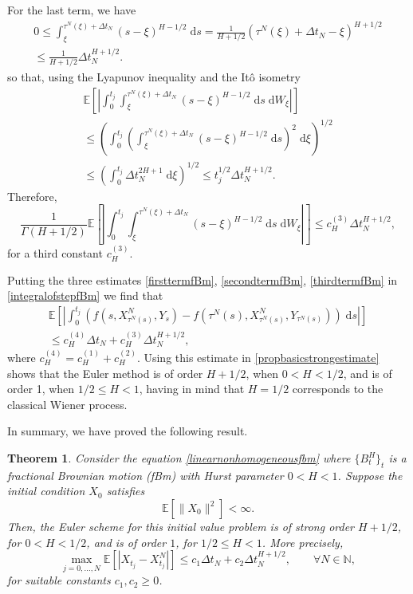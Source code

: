 \documentclass[reqno,12pt]{amsart}
\theoremstyle{plain} %
\newtheorem{theorem}{Theorem}[section]
\theoremstyle{definition} %
\begin{document}
For the last term, we have
\begin{multline*}
    0 \leq \int_\xi^{\tau^N(\xi) + \Delta t_N} (s - \xi)^{H-1/2} \;\mathrm{d}s = \frac{1}{H + 1/2} (\tau^N(\xi) + \Delta t_N - \xi)^{H + 1/2} \\
    \leq \frac{1}{H + 1/2} \Delta t_N^{H + 1/2}.
\end{multline*}
so that, using the Lyapunov inequality and the It\^o isometry
\begin{multline*}
    \mathbb{E}\left[\left|\int_0^{t_j} \int_\xi^{\tau^N(\xi) + \Delta t_N} (s - \xi)^{H-1/2} \;\mathrm{d}s \;\mathrm{d}W_\xi\right|\right] \\
    \leq \left( \int_0^{t_j} \left(\int_\xi^{\tau^N(\xi) + \Delta t_N} (s - \xi)^{H-1/2} \;\mathrm{d}s\right)^2 \;\mathrm{d}\xi\right)^{1/2} \\ 
    \leq \left( \int_0^{t_j} \Delta t_N^{2H + 1} \;\mathrm{d}\xi\right)^{1/2} \leq t_j^{1/2} \Delta t_N^{H + 1/2}.
\end{multline*}
Therefore,
\begin{equation}
    \label{thirdtermfBm}
    \frac{1}{\Gamma(H + 1/2)}\mathbb{E}\left[\left|\int_0^{t_j} \int_\xi^{\tau^N(\xi) + \Delta t_N} (s - \xi)^{H-1/2} \;\mathrm{d}s \;\mathrm{d}W_\xi\right|\right] \leq c_H^{(3)} \Delta t_N^{H + 1/2},
\end{equation}
for a third constant $c_H^{(3)}$.

Putting the three estimates \cref{firsttermfBm}, \cref{secondtermfBm}, \cref{thirdtermfBm} in \cref{integralofstepfBm} we find that
\begin{multline}
    \mathbb{E}\left[\left|\int_0^{t_j} \left( f(s, X_{\tau^N(s)}^N, Y_s) - f(\tau^N(s), X_{\tau^N(s)}^N, Y_{\tau^N(s)}) \right)\;\mathrm{d}s\right|\right] \\
    \leq c_H^{(4)} \Delta t_N + c_H^{(3)} \Delta t_N^{H + 1/2},
\end{multline}
where $c_H^{(4)} = c_H^{(1)} + c_H^{(2)}$. Using this estimate in \cref{propbasicstrongestimate} shows that the Euler method is of order $H + 1/2$, when $0 < H < 1/2$, and is of order 1, when $1/2 \leq H < 1$, having in mind that $H=1/2$ corresponds to the classical Wiener process.

In summary, we have proved the following result.
\begin{theorem}
    Consider the equation \cref{linearnonhomogeneousfbm} where $\{B^H_t\}_t$ is a fractional Brownian motion (fBm) with Hurst parameter $0 < H < 1$. Suppose the initial condition $X_0$ satisfies
    \begin{equation}
        \label{EX0square2b}
        \mathbb{E}[\|X_0\|^2] < \infty.
    \end{equation}
    Then, the Euler scheme for this initial value problem is of strong order $H+1/2$, for $0 < H < 1/2$, and is of order $1$, for $1/2 \leq H < 1$. More precisely,
    \begin{equation}
        \max_{j=0, \ldots, N}\mathbb{E}\left[ \left| X_{t_j} - X_{t_j}^N \right| \right] \leq c_1 \Delta t_N + c_2 \Delta t_N^{H + 1/2}, \qquad \forall N \in \mathbb{N},
    \end{equation}
    for suitable constants $c_1, c_2 \geq 0$.
\end{theorem}
\end{document}

